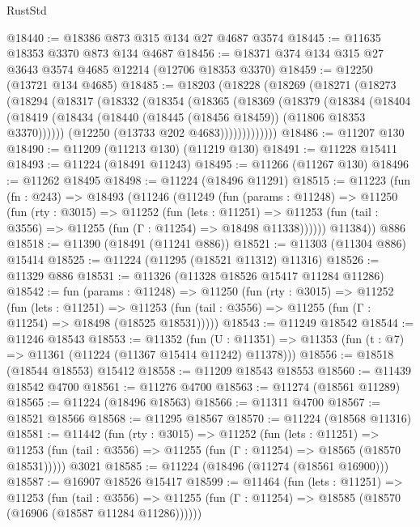 \begin{lexlean}{RustStd}
\begin{coremodule}
@18440 := @18386 @873 @315 @134 @27 @4687 @3574
@18445 := @11635 @18353 @3370 @873 @134 @4687
@18456 := @18371 @374 @134 @315 @27 @3643 @3574 @4685 @12214 (@12706 @18353 @3370)
@18459 := @12250 (@13721 @134 @4685)
@18485 := @18203
    (@18228
      (@18269
        (@18271
          (@18273
            (@18294
              (@18317
                (@18332
                  (@18354
                    (@18365
                      (@18369
                        (@18379
                          (@18384
                            (@18404
                              (@18419
                                (@18434 (@18440 (@18445 (@18456 @18459)) (@11806 @18353 @3370))))))
                          (@12250 (@13733 @202 @4683)))))))))))))
@18486 := @11207 @130
@18490 := @11209 (@11213 @130) (@11219 @130)
@18491 := @11228 @15411
@18493 := @11224 (@18491 @11243)
@18495 := @11266 (@11267 @130)
@18496 := @11262 @18495
@18498 := @11224 (@18496 @11291)
@18515 := @11223
    (fun (fn : @243) =>
    @18493
      (@11246
        (@11249
          (fun (params : @11248) =>
          @11250
            (fun (rty : @3015) =>
            @11252
              (fun (lets : @11251) =>
              @11253 (fun (tail : @3556) => @11255 (fun (Γ : @11254) => @18498 @11338))))))
        @11384))
    @886
@18518 := @11390 (@18491 (@11241 @886))
@18521 := @11303 (@11304 @886) @15414
@18525 := @11224 (@11295 (@18521 @11312) @11316)
@18526 := @11329 @886
@18531 := @11326 (@11328 @18526 @15417 @11284 @11286)
@18542 := fun (params : @11248) =>
  @11250
    (fun (rty : @3015) =>
    @11252
      (fun (lets : @11251) =>
      @11253 (fun (tail : @3556) => @11255 (fun (Γ : @11254) => @18498 (@18525 @18531)))))
@18543 := @11249 @18542
@18544 := @11246 @18543
@18553 := @11352
    (fun (U : @11351) => @11353 (fun (t : @7) => @11361 (@11224 (@11367 @15414 @11242) @11378)))
@18556 := @18518 (@18544 @18553) @15412
@18558 := @11209 @18543 @18553
@18560 := @11439 @18542 @4700
@18561 := @11276 @4700
@18563 := @11274 (@18561 @11289)
@18565 := @11224 (@18496 @18563)
@18566 := @11311 @4700
@18567 := @18521 @18566
@18568 := @11295 @18567
@18570 := @11224 (@18568 @11316)
@18581 := @11442
    (fun (rty : @3015) =>
    @11252
      (fun (lets : @11251) =>
      @11253 (fun (tail : @3556) => @11255 (fun (Γ : @11254) => @18565 (@18570 @18531)))))
    @3021
@18585 := @11224 (@18496 (@11274 (@18561 @16900)))
@18587 := @16907 @18526 @15417
@18599 := @11464
    (fun (lets : @11251) =>
    @11253
      (fun (tail : @3556) =>
      @11255 (fun (Γ : @11254) => @18585 (@18570 (@16906 (@18587 @11284 @11286))))))

\end{coremodule}
\end{lexlean}
